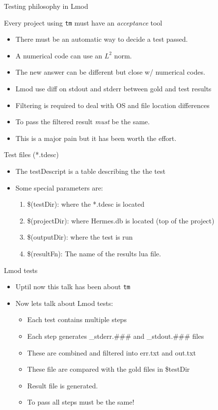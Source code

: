 \documentclass{beamer}
\begin{document}
\begin{rame}{Testing philosophy in Lmod}
\begin{frame}{Every project using \texttt{tm} must have an \emph{acceptance} tool}
  \begin{itemize}
    \item There must be an automatic way to decide a test passed.
    \item A numerical code can use an $L^2$ norm. 
    \item The new answer can be different but close w/ numerical codes.
    \item Lmod use diff on stdout and stderr between gold and test
      results
    \item Filtering is required to deal with OS and file location
      differences
    \item To pass the filtered result {\color{blue} \emph{must}} be
      the same.
    \item This is a major pain but it has been worth the effort.
  \end{itemize}
\end{frame}

\begin{frame}{Test files (*.tdesc)}
  \begin{itemize}
    \item The testDescript is a table describing the the test
    \item Some special parameters are:
      \begin{enumerate}
        \item \$(testDir): where the *.tdesc is located
        \item \$(projectDir): where Hermes.db is located (top of the
          project)
        \item \$(outputDir): where the test is run
        \item \$(resultFn): The name of the results lua file.
      \end{enumerate}
  \end{itemize}
\end{frame}

\begin{frame}{Lmod tests}
  \begin{itemize}
    \item Uptil now this talk has been about \texttt{tm}
    \item Now lets talk about Lmod tests:
      \begin{itemize}
        \item Each test contains multiple steps
        \item Each step generates \_stderr.\#\#\# and \_stdout.\#\#\# files
        \item These are combined and filtered into err.txt and out.txt
        \item These file are compared with the gold files in \$testDir
        \item Result file is generated.
        \item To pass all steps must be the same!
      \end{itemize}
  \end{itemize}
\end{frame}


\end{rame}
\end{document}
